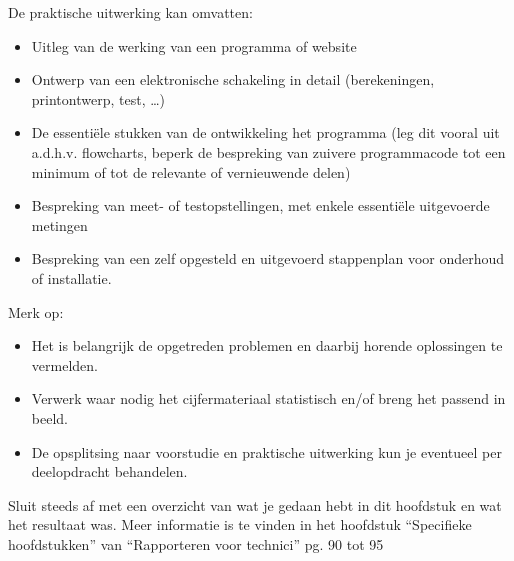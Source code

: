De praktische uitwerking kan omvatten:
\begin{itemize}[]
    \item Uitleg van de werking van een programma of website
    \item Ontwerp van een elektronische schakeling in detail (berekeningen, printontwerp, test, …)
    \item De essentiële stukken van de ontwikkeling het programma (leg dit vooral uit a.d.h.v. flowcharts, beperk de bespreking van zuivere programmacode tot een minimum of tot de relevante of vernieuwende delen)
    \item Bespreking van meet- of testopstellingen, met enkele essentiële uitgevoerde metingen
    \item Bespreking van een zelf opgesteld en uitgevoerd stappenplan voor onderhoud of installatie.
\end{itemize}

Merk op:
\begin{itemize}[]
    \item Het is belangrijk de opgetreden problemen en daarbij horende oplossingen te vermelden.
    \item Verwerk waar nodig het cijfermateriaal statistisch en/of breng het passend in beeld.
    \item De opsplitsing naar voorstudie en praktische uitwerking kun je eventueel per deelopdracht behandelen.
\end{itemize}

Sluit steeds af met een overzicht van wat je gedaan hebt in dit hoofdstuk en wat het resultaat was.
Meer informatie is te vinden in het hoofdstuk “Specifieke hoofdstukken” van “Rapporteren voor technici” pg.
90 tot 95